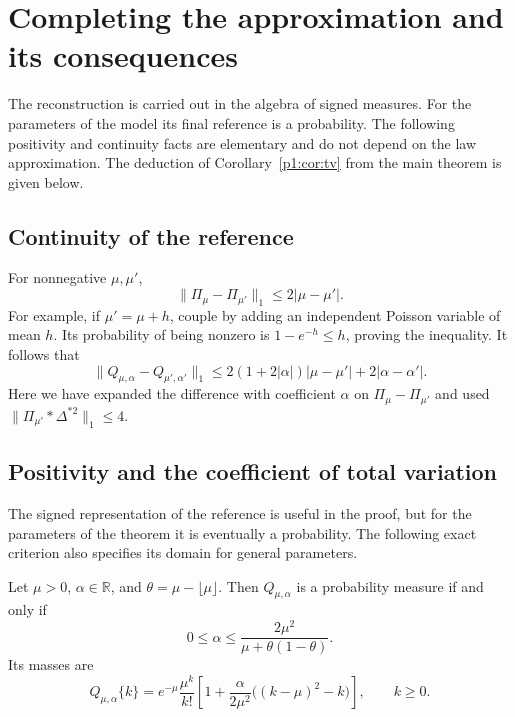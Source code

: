 \section{Completing the approximation and its consequences}
\label{p14:reference:section}

The reconstruction is carried out in the algebra of signed measures.
For the parameters of the model its final reference is a probability.
The following positivity and continuity facts are elementary and do not
depend on the law approximation. The deduction of
Corollary~\ref{p1:cor:tv} from the main theorem is given below.

\subsection{Continuity of the reference}

For nonnegative $\mu,\mu'$,
\begin{equation}
 \|\Pi_\mu-\Pi_{\mu'}\|_1\le2|\mu-\mu'|.
 \label{p1:close:poisson-lipschitz}
\end{equation}
For example, if $\mu'=\mu+h$, couple by adding an independent
Poisson variable of mean $h$.  Its probability of being nonzero
is $1-e^{-h}\le h$, proving the inequality.
It follows that
\begin{equation}
 \|Q_{\mu,\alpha}-Q_{\mu',\alpha'}\|_1
 \le2(1+2|\alpha|)|\mu-\mu'|+2|\alpha-\alpha'|.
 \label{p1:close:reference-lipschitz}
\end{equation}
Here we have expanded the difference with coefficient $\alpha$
on $\Pi_\mu-\Pi_{\mu'}$ and used
$\|\Pi_{\mu'}*\Delta^{*2}\|_1\le4$.

\subsection{Positivity and the coefficient of total variation}
\label{p1:close:positivity-section}

The signed representation of the reference is useful in the
proof, but for the parameters of the theorem it is eventually
a probability.  The following exact criterion also specifies
its domain for general parameters.

\begin{lemma}
\label{p1:close:positivity}
Let $\mu>0$, $\alpha\in\mathbb R$, and
$\theta=\mu-\lfloor\mu\rfloor$.  Then $Q_{\mu,\alpha}$ is a
probability measure if and only if
\begin{equation}
 0\le\alpha\le
       \frac{2\mu^2}{\mu+\theta(1-\theta)}.
 \label{p1:close:positivity-range}
\end{equation}
Its masses are
\begin{equation}
 Q_{\mu,\alpha}\{k\}
 =e^{-\mu}\frac{\mu^k}{k!}
   \left[1+\frac{\alpha}{2\mu^2}
                    \bigl((k-\mu)^2-k\bigr)\right],
 \qquad k\ge0.
 \label{p1:close:charlier-masses}
\end{equation}
\end{lemma}

